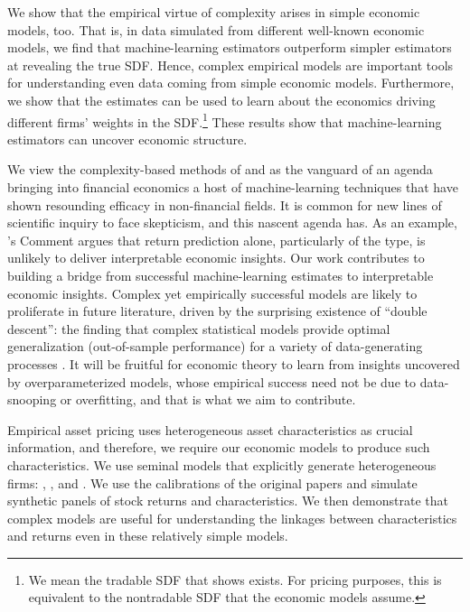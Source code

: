 \documentclass[12pt]{scrarticle}
\begin{document}
We show that the empirical virtue of complexity arises in simple economic models, too. That is, in data simulated from different well-known economic models, we find that machine-learning estimators \citep[e.g.][]{kps,dkkm} outperform simpler estimators \citep[e.g.][]{fama-french-2015,fama_french_2019} at revealing the true SDF. Hence, complex empirical models are important tools for understanding even data coming from simple economic models. Furthermore, we show that the estimates can be used to learn about the economics driving different firms' weights in the SDF.\footnote{We mean the tradable SDF that \citet{hansen-richard} shows exists. For pricing purposes, this is equivalent to the nontradable SDF that the economic models assume.} These results show that machine-learning estimators can uncover economic structure.%

We view the complexity-based methods of \citet{kelly_malamud_zhou_2024} and \citet{dkkm} as the vanguard of an agenda bringing into financial economics a host of machine-learning techniques that have shown resounding efficacy in non-financial fields. It is common for new lines of scientific inquiry to face skepticism, and this nascent agenda has. As an example, \citet{berk2023}'s Comment argues that return prediction alone, particularly of the \citet{kelly_malamud_zhou_2024} type, is unlikely to deliver interpretable economic insights. Our work contributes to building a bridge from successful machine-learning estimates to interpretable economic insights. Complex yet empirically successful models are likely to proliferate in future literature, driven by the surprising existence of ``double descent'': the finding that complex statistical models provide optimal generalization (out-of-sample performance) for a variety of data-generating processes \citep{hastie2022surprises}. It will be fruitful for economic theory to learn from insights uncovered by overparameterized models, whose empirical success need not be due to data-snooping or overfitting, and that is what we aim to contribute.

Empirical asset pricing uses heterogeneous asset characteristics as crucial information, and therefore, we require our economic models to produce such characteristics. We use seminal models that explicitly generate heterogeneous firms: \citet*{bgn}, \cite{kp_2014}, and \cite{GS21}.  We use the calibrations of the original papers and simulate synthetic panels of stock returns and characteristics.  We then demonstrate that complex models are useful for understanding the linkages between characteristics and returns even in these relatively simple models.
\end{document}

